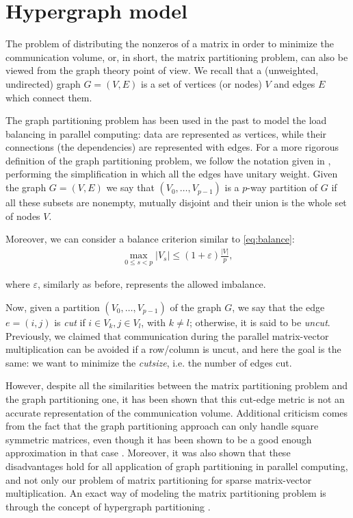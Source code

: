 \section{Hypergraph model}

The problem of distributing the nonzeros of a matrix in order to minimize the communication volume, or, in short, the matrix partitioning problem, can also be viewed from the graph theory point of view. We recall that a (unweighted, undirected) graph $G=(V,E)$ is a set of vertices (or nodes) $V$ and edges $E$ which connect them. 

The graph partitioning problem has been used in the past to model the load balancing in parallel computing: data are represented as vertices, while their connections (the dependencies) are represented with edges. For a more rigorous definition of the graph partitioning problem, we follow the notation given in \cite{hypergraph_model},  performing the simplification in which all the edges have unitary weight. Given the graph $G=(V,E)$ we say that $(V_0,\dots,V_{p-1})$ is a $p$-way partition of $G$ if all these subsets are nonempty, mutually disjoint and their union is the whole set of nodes $V$. 

Moreover, we can consider a balance criterion similar to \eqref{eq:balance}:
\begin{align}
	\max_{0\leq s <p}	|V_s| \leq (1+\varepsilon)\frac{|V|}{p},
	\label{eq:balance_hypergraph}
\end{align}

where $\varepsilon$, similarly as before, represents the allowed imbalance.

Now, given a partition $(V_0,\dots,V_{p-1})$ of the graph $G$, we say that the edge $e=(i,j)$ is \emph{cut} if $i \in V_k, j \in V_l$, with $k \neq l$; otherwise, it is said to be \emph{uncut}. Previously, we claimed that communication during the parallel matrix-vector multiplication can be avoided if a row/column is uncut, and here the goal is the same: we want to minimize the \emph{cutsize}, i.e. the number of edges cut.

However, despite all the similarities between the matrix partitioning problem and the graph partitioning one, it has been shown \cite{hypergraph_model} that this cut-edge metric is not an accurate representation of the communication volume. Additional criticism \cite{hendrickson_emperor} comes from the fact that the graph partitioning approach can only handle square symmetric matrices, even though it has been shown to be a good enough approximation in that case \cite{zoltan_worth-it}. Moreover, it was also shown \cite{hendrickson_kolda} that these disadvantages hold for all application of graph partitioning in parallel computing, and not only our problem of matrix partitioning for sparse matrix-vector multiplication. An exact way of modeling the matrix partitioning problem is through the concept of hypergraph partitioning \cite{hypergraph_model}.

